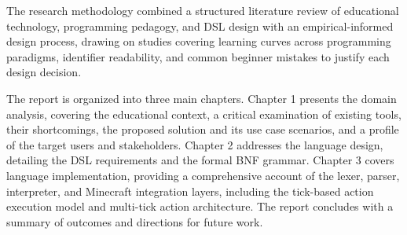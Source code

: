 The research methodology combined a structured literature review of educational technology, 
programming pedagogy, and DSL design with an empirical-informed design process, drawing on 
studies covering learning curves across programming paradigms, identifier readability, and 
common beginner mistakes to justify each design decision.

The report is organized into three main chapters. Chapter 1 presents the domain analysis,
covering the educational context, a critical examination of existing tools, their
shortcomings, the proposed solution and its use case scenarios, and a profile of the target 
users and stakeholders. Chapter 2 addresses the language design, detailing the DSL 
requirements and the formal BNF grammar. Chapter 3 covers language implementation, providing
a comprehensive account of the lexer, parser, interpreter, and Minecraft integration layers,
including the tick-based action execution model and multi-tick action architecture. The report
concludes with a summary of outcomes and directions for future work.
